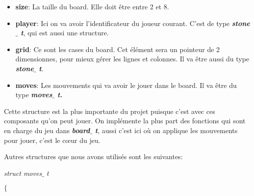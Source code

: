\documentclass[a4paper,12pt]{article}
\begin{document}
\begin{itemize}
	\item \textbf{size}: La taille du board. Elle doit être entre 2 et 8.\par

	\item \textbf{player}: Ici on va avoir l’identificateur du joueur courant. C’est de type \textbf{\textit{stone$ \_ $ t}}, qui est aussi une structure.\par

	\item \textbf{grid}: Ce sont les cases du board. Cet élément sera un pointeur de 2 dimensionnes, pour mieux gérer les lignes et colonnes. Il va être aussi du type \textbf{\textit{stone$ \_ $ t}}. \par

	\item \textbf{moves}: Les mouvements qui va avoir le jouer dans le board. Il va être du type \textbf{\textit{moves$ \_ $ t.}}
\end{itemize}\par


\noindent \begin{justify}
Cette structure est la plus importante du projet puisque c’est avec ces composants qu’on peut jouer. On implémente la plus part des fonctions qui sont en charge du jeu dans \textbf{\textit{board$ \_ $ t}}, aussi c’est ici où on applique les mouvements pour jouer, c’est le cœur du jeu.
\end{justify}\par


\noindent \begin{justify}
Autres structures que nous avons utilisés sont les suivantes:
\end{justify}\par


\vspace{\baselineskip}

\noindent \begin{justify}
\hspace*{0.49in}\hspace*{0.49in}\hspace*{0.49in}\hspace*{0.49in}\textit{struct moves$ \_ $ t}
\end{justify}\par


\noindent \hspace*{0.49in}\hspace*{0.49in}\hspace*{0.49in}\textit{\hspace*{0.49in}$ \{ $ }\par
\end{document}
